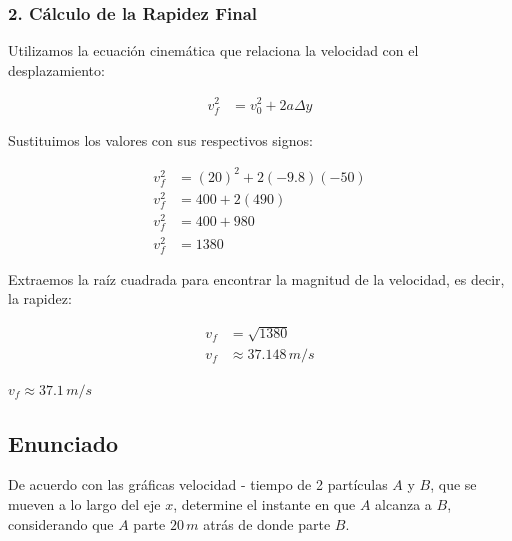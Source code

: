 \documentclass[12pt, a4paper]{article}
\begin{document}
\subsubsection*{2. Cálculo de la Rapidez Final}
Utilizamos la ecuación cinemática que relaciona la velocidad con el desplazamiento:

\begin{align*}
v_f^2 &= v_0^2 + 2 a \Delta y
\end{align*}

Sustituimos los valores con sus respectivos signos:

\begin{align*}
v_f^2 &= (20)^2 + 2 (-9.8) (-50) \\
v_f^2 &= 400 + 2 (490) \\
v_f^2 &= 400 + 980 \\
v_f^2 &= 1380
\end{align*}

Extraemos la raíz cuadrada para encontrar la magnitud de la velocidad, es decir, la rapidez:

\begin{align*}
v_f &= \sqrt{1380} \\
v_f &\approx 37.148 \, \si{m/s}
\end{align*}

\begin{tcolorbox}[colback=green!5!white, colframe=green!50!black, title=Respuesta Final]
\centering \Large $v_f \approx 37.1 \, \si{m/s}$
\end{tcolorbox}

\newpage

\subsection*{Enunciado}
De acuerdo con las gráficas velocidad - tiempo de 2 partículas $A$ y $B$, que se mueven a lo largo del eje $x$, determine el instante en que $A$ alcanza a $B$, considerando que $A$ parte $20 \, \si{m}$ atrás de donde parte $B$.

\begin{center}
\end{center}
\end{document}
